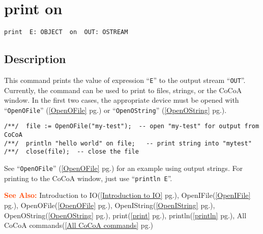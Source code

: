 \documentclass[a4paper]{mybook}
\newenvironment{command}{}{} %
\newcommand\SeeAlso{\par\textcolor{OrangeRed}{\textbf{\large See Also: }}}
\begin{document}
\section{print on}
\label{print on}
\begin{command} %


\begin{Verbatim}[label=syntax, rulecolor=\color{MidnightBlue},
frame=single]
print  E: OBJECT  on  OUT: OSTREAM
\end{Verbatim}


\subsection*{Description}

This command prints the value of expression ``\verb&E&'' to the output stream ``\verb&OUT&''.
Currently, the command can be used to print to files, strings, or the
CoCoA window.  In the first two cases, the appropriate device must be
opened with ``\verb&OpenOFile&'' (\ref{OpenOFile} pg.\pageref{OpenOFile}) or ``\verb&OpenOString&'' (\ref{OpenOString} pg.\pageref{OpenOString}).
\begin{Verbatim}[label=example, rulecolor=\color{PineGreen}, frame=single]
/**/  file := OpenOFile("my-test");  -- open "my-test" for output from CoCoA
/**/  println "hello world" on file;   -- print string into "mytest"
/**/  close(file);  -- close the file
\end{Verbatim}

See ``\verb&OpenOFile&'' (\ref{OpenOFile} pg.\pageref{OpenOFile}) for an example using output strings.
For printing to the CoCoA window, just use ``\verb&println E&''.

\SeeAlso %
  Introduction to IO(\ref{Introduction to IO} pg.\pageref{Introduction to IO}), 
    OpenIFile(\ref{OpenIFile} pg.\pageref{OpenIFile}), 
    OpenOFile(\ref{OpenOFile} pg.\pageref{OpenOFile}), 
    OpenIString(\ref{OpenIString} pg.\pageref{OpenIString}), 
    OpenOString(\ref{OpenOString} pg.\pageref{OpenOString}), 
    print(\ref{print} pg.\pageref{print}), 
    println(\ref{println} pg.\pageref{println}), 
    All CoCoA commands(\ref{All CoCoA commands} pg.\pageref{All CoCoA commands})
\end{command} %
\end{document}
